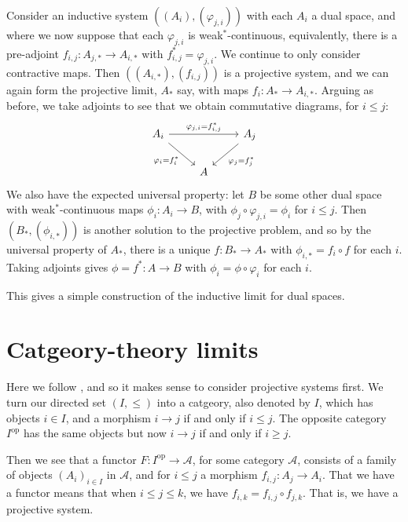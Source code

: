 \documentclass[a4paper,11pt]{article}
\newcommand{\mc}[1]{{\mathcal{#1}}}
\newcommand{\op}{{\operatorname{op}}}
\theoremstyle{definition}
\begin{document}
Consider an inductive system $((A_i), (\varphi_{j,i}))$ with each $A_i$ a dual space, and where we now suppose that each $\varphi_{j,i}$ is weak$^*$-continuous, equivalently, there is a pre-adjoint $f_{i,j} \colon A_{j,*} \to A_{i,*}$ with $f_{i,j}^* = \varphi_{j,i}$.  We continue to only consider contractive maps.  Then $((A_{i,*}), (f_{i,j}))$ is a projective system, and we can again form the projective limit, $A_*$ say, with maps $f_i \colon A_* \to A_{i,*}$.  Arguing as before, we take adjoints to see that we obtain commutative diagrams, for $i\leq j$:
\[\begin{tikzcd}
    A_i \arrow[rr, "\varphi_{j,i} = f_{i,j}^*"] \arrow[rd, "\varphi_i = f_i^*"'] &&
      A_j \arrow[ld, "\varphi_j = f_j^*"] \\
    & A
\end{tikzcd}\]
We also have the expected universal property: let $B$ be some other dual space with weak$^*$-continuous maps $\phi_i \colon A_i \to B$, with $\phi_j \circ \varphi_{j,i} = \phi_i$ for $i\leq j$.  Then $(B_*, (\phi_{i,*}))$ is another solution to the projective problem, and so by the universal property of $A_*$, there is a unique $f \colon B_* \to A_*$ with $\phi_{i,*} = f_i \circ f$ for each $i$.  Taking adjoints gives $\phi = f^* \colon A \to B$ with $\phi_i = \phi \circ \varphi_i$ for each $i$.

This gives a simple construction of the inductive limit for dual spaces.






\section{Catgeory-theory limits}\label{sec:cat_theory_limits}

Here we follow \cite[Chapter~5]{leinster}, and so it makes sense to consider projective systems first.   We turn our directed set $(I,\leq)$ into a catgeory, also denoted by $I$, which has objects $i\in I$, and a morphism $i\to j$ if and only if $i\leq j$.  The opposite category $I^\op$ has the same objects but now $i\to j$ if and only if $i\geq j$.

Then we see that a functor $F\colon I^\op \to \mc A$, for some category $\mc A$, consists of a family of objects $(A_i)_{i\in I}$ in $\mc A$, and for $i\leq j$ a morphism $f_{i,j} \colon A_j \to A_i$.  That we have a functor means that when $i\leq j\leq k$, we have $f_{i,k} = f_{i,j} \circ f_{j,k}$.  That is, we have a projective system.
\end{document}
